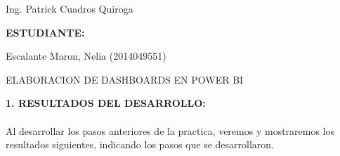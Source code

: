 \documentclass[12pt,letterpaper]{article}
\begin{document}
\begin{titlepage}
\begin{center}
\vspace*{0.1in}
\begin{large}
 Ing. Patrick Cuadros Quiroga\\
\end{large}

\vspace*{0.2in}
\vspace*{0.1in}
\begin{large}
\textbf{ESTUDIANTE:} \\
\vspace{\baselineskip}
\begin{flushleft}

Escalante Maron, Nelia 		\hfill	(2014049551) \\

\end{flushleft}
\end{large}
\end{center}

\end{titlepage}

\newpage

	\begin{center}
		\Large ELABORACION DE DASHBOARDS EN POWER BI
	\end{center}
	\vspace{\baselineskip}
	\vspace{\baselineskip}
	\textbf{\Large 1. RESULTADOS DEL DESARROLLO:}
	\\\\
Al desarrollar los pasos anteriores de la practica, veremos y mostraremos los resultados siguientes, indicando los pasos que se desarrollaron. \\\\
\end{document}
